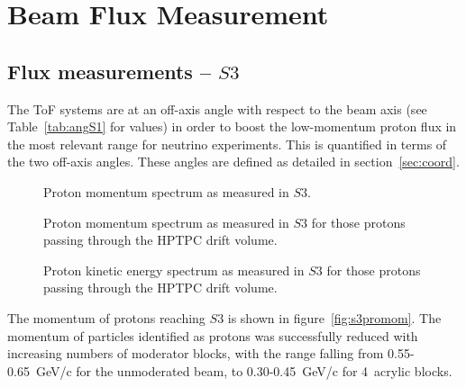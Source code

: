 \section{Beam Flux Measurement}
\label{hptpcPaper:sec:Results}

\subsection{Flux measurements -- $\mathit{S3}$}

The ToF systems are at an off-axis angle with respect to the beam axis (see Table~\ref{tab:angS1} for values) in order to boost the low-momentum proton flux in the most relevant range for neutrino experiments.
This is quantified in terms of the two off-axis angles.
These angles are defined as detailed in section~\ref{sec:coord}.

\begin{figure}[ht]
  \centering
  \begin{minipage}[t]{0.49\textwidth}
    \begin{adjustbox}{max totalsize={\textwidth}, center}
      
    \end{adjustbox}
    \caption{Proton momentum spectrum as measured in $\mathit{S3}$.}
    \label{fig:s3promom}
  \end{minipage}
  \hfill
  \begin{minipage}[t]{0.49\textwidth}
    \begin{adjustbox}{max totalsize={\textwidth}, center}
      
    \end{adjustbox}
    \caption{Proton momentum spectrum as measured in $\mathit{S3}$ for those protons passing through the HPTPC drift volume.}
    \label{fig:tpcpromom}
  \end{minipage}
\end{figure}

\begin{figure}[ht]
  \centering
  \begin{adjustbox}{max totalsize={0.5\textwidth}, center}
      
  \end{adjustbox}
  \caption{Proton kinetic energy spectrum as measured in $\mathit{S3}$ for those protons passing through the HPTPC drift volume.}
  \label{fig:tpcproke}
\end{figure}

The momentum of protons reaching $\mathit{S3}$ is shown in figure~\ref{fig:s3promom}. 
The momentum of particles identified as protons was successfully reduced with increasing numbers of moderator blocks, with the range falling from 0.55-0.65~GeV/c for the unmoderated beam, to 0.30-0.45~GeV/c for 4~acrylic blocks.

